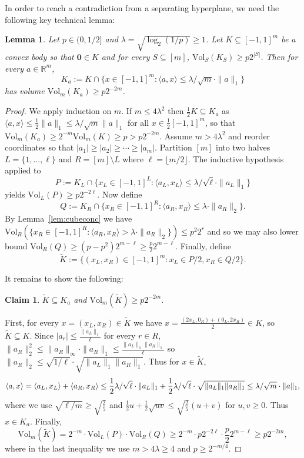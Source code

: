 \documentclass[12pt,english]{article}
\theoremstyle{theorem}
\newtheorem{lemma}[theorem]{Lemma}
\newtheorem*{claim*}{Claim}
\theoremstyle{remark}
\providecommand{\setR}{\mathbb{R}}
\newcommand{\Vol}{\mathrm{Vol}}
\begin{document}
In order to reach a contradiction from a separating hyperplane, we need the following key technical lemma:

\begin{lemma} \label{lem:VolumeEllOneCap} Let $p \in (0,1/2]$ and $\lambda = \sqrt{\log_2 (1/p)} \ge 1$. Let $K \subseteq [-1,1]^m$ be a convex body so that $\mathbf{0} \in K$ and for every $S \subseteq [m]$, $\Vol_S (K_S) \ge p 2^{|S|}$. Then for every $a \in \setR^m$, \[K_a := K \cap \Big\{x \in [-1,1]^m : \langle a, x \rangle \le \lambda/\sqrt{m} \cdot \|a\|_1 \Big\}\] has volume $\Vol_m (K_a) \ge p 2^{-2m}$.
\end{lemma}
\iffalse
\begin{proof}

We apply induction on $m$. If $m \le 4\lambda^2$ then $\tfrac{1}{2} K \subseteq K_a$ as $\langle a,x \rangle \le \tfrac{1}{2} \|a\|_1 \le \lambda/\sqrt{m} \|a\|_1$ for all $x \in \tfrac{1}{2} [-1,1]^m$, so that $\Vol_m (K_a) \ge 2^{-m} \Vol_m(K) \ge p > p 2^{-2m}$.
 Assume $ m > 4 \lambda^2$ and reorder coordinates so that $|a_1| \ge |a_2| \ge \cdots \ge |a_m|$. Partition $[m]$ into two halves $L = \{1, \dots, \ell\}$ and $R = [m] \setminus L$ where $\ell = \lfloor m/2 \rfloor$. The inductive hypothesis applied to \[P := K_L \cap \Big\{x_L \in [-1,1]^L : \langle a_L, x_L \rangle \le \lambda/\sqrt{\ell} \cdot \|a_L \|_1 \Big\}\]
 yields $\Vol_L (P) \ge p 2^{-2\ell}$. Now define
 \[ Q := K_R \cap \Big\{x_R \in [-1,1]^R : \langle a_R, x_R \rangle \le \lambda \cdot \|a_R \|_2 \Big\}. \]
By Lemma~\ref{lem:cubeconc} we have $\Vol_R (\{x_R \in [-1,1]^R : \langle a_R, x_R \rangle > \lambda \cdot \|a_R \|_2 \}) \le p^2 2^r$ and so we may also lower bound $\Vol_R (Q) \ge (p-p^2)2^{m-\ell} \ge \frac{p}{2} 2^{m-\ell}$.
Finally, define \[ \widetilde{K} := \{(x_L, x_R) \in [-1,1]^m : x_L \in P/2, x_R \in Q/2\}. \]

It remains to show the following:
\begin{claim*}
$\widetilde{K} \subseteq K_a$ and $\Vol_m (\widetilde{K}) \ge p 2^{-2m}.$
\end{claim*}

First, for every $x = (x_L, x_R) \in \widetilde{K}$ we have $x = \frac{(2x_L,0_R) + (0_L,2x_R)}{2} \in K$, so $\widetilde{K} \subseteq K$. Since $|a_r| \le \frac{\|a_L\|_1}{\ell}$ for every $r \in R$, $\|a_R\|^2_2 \le \|a_R\|_\infty \cdot \|a_R\|_1 \le \frac{\|a_L\|_1 \|a_R\|_1}{\ell}$ so $\|a_R\|_2 \le  \sqrt{1/\ell} \cdot \sqrt{\|a_L\|_1\|a_R\|_1}$. Thus for $x \in \widetilde{K}$,
\[\langle a,x \rangle =\langle a_L ,x_L \rangle + \langle a_R ,x_R \rangle \\ \le \frac{1}{2} \lambda/\sqrt{\ell} \cdot \|a_L\|_1 + \frac{1}{2} \lambda/\sqrt{\ell} \cdot \sqrt{\|a_L\|_1\|a_R\|_1} \le \lambda/\sqrt{m} \cdot \|a\|_1, \]
where we use $\sqrt{\ell/m} \ge \sqrt{\tfrac{2}{5}}$ and $\tfrac{1}{2} u + \tfrac{1}{2} \sqrt{uv} \le \sqrt{\tfrac{2}{5}} (u+v)$ for $u,v \ge 0$. Thus $x \in K_a$. Finally,
\[ \Vol_m (\widetilde{K}) = 2^{-m} \cdot \Vol_L (P) \cdot \Vol_R (Q) \ge 2^{-m} \cdot p2^{-2\ell} \cdot \frac{p}{2} 2^{m-\ell} \ge p 2^{-2m},  \]
where in the last inequality we use $m > 4\lambda \ge 4$ and $p \ge 2^{-m/4}$.
\end{proof}
\end{document}
